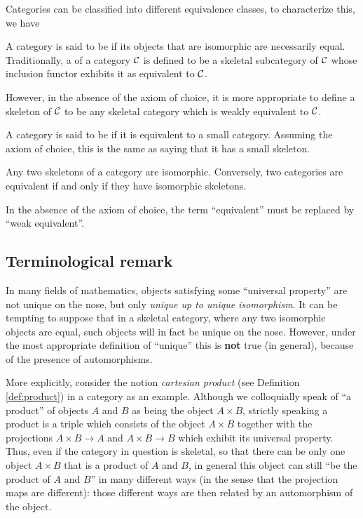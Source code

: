   Categories can be classified into different equivalence classes, to characterize this, we have
  \begin{defn}
    A category is said to be  if its objects that are isomorphic are necessarily equal.
    Traditionally, a  of a category ${\cal C}$ is defined to be a skeletal subcategory of ${\cal C}$ whose inclusion functor exhibits it as equivalent to ${\cal C}$.
  \end{defn}
  \begin{rem}
    However, in the absence of the axiom of choice, it is more appropriate to define a skeleton of ${\cal C}$ to be any skeletal category which is weakly equivalent to ${\cal C}$.
  \end{rem}
  \begin{defn}
    A category is said to be  if it is equivalent to a small category. Assuming the axiom of choice, this is the same as saying that it has a small skeleton.
  \end{defn}
  \begin{prop}
    Any two skeletons of a category are isomorphic. Conversely, two categories are equivalent if and only if they have isomorphic skeletons.
  \end{prop}
  \begin{rem}
    In the absence of the axiom of choice, the term ``equivalent'' must be replaced by ``weak equivalent''.
  \end{rem}

\subsection{Terminological remark}
    In many fields of mathematics, objects satisfying some ``universal property'' are not unique on the nose, but only \emph{unique up to unique isomorphism}. It can be tempting to suppose that in a skeletal category, where any two isomorphic objects are equal, such objects will in fact be unique on the nose. However, under the most appropriate definition of ``unique'' this is \textbf{not} true (in general), because of the presence of automorphisms.

    More explicitly, consider the notion \emph{cartesian product} (see Definition \ref{def:product}) in a category as an example. Although we colloquially speak of  ``a product'' of objects $A$ and $B$ as being the object $A\times B$, strictly speaking a product is a triple which consists of the object $A\times B$ together with the projections $A\times B\to A$ and $A\times B\to B$ which exhibit its universal property.
    Thus, even if the category in question is skeletal, so that there can be only one object $A\times B$ that is a product of $A$ and $B$, in general this object can still ``be the product of $A$ and $B$'' in many different ways (in the sense that the projection maps are different): those different ways are then related by an automorphism of the object.

